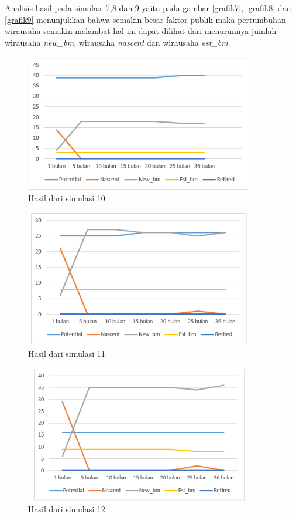 Analisis hasil pada simulasi 7,8 dan 9 yaitu pada gambar \ref{grafik7}, \ref{grafik8} dan \ref{grafik9} menunjukkan bahwa semakin besar faktor publik maka pertumbuhan wirausaha semakin melambat hal ini dapat dilihat dari menurunnya jumlah wirausaha \textit{new\_bm}, wirausaha \textit{nascent} dan wirausaha \textit{est\_bm}.

	\begin{figure} [H]
	\centering  
	\includegraphics[width=10cm, height=6cm]{grafik10} 
		\caption[Hasil dari simulasi 10]{Hasil dari simulasi 10}
	\label{grafik10} 
\end{figure}

	\begin{figure} [H]
	\centering  
	\includegraphics[width=10cm, height=6cm]{grafik11} 
		\caption[Hasil dari simulasi 11]{Hasil dari simulasi 11}
	\label{grafik11} 
\end{figure}

	\begin{figure} [H]
	\centering  
	\includegraphics[width=10cm, height=6cm]{grafik12} 
		\caption[Hasil dari simulasi 12]{Hasil dari simulasi 12}
	\label{grafik12} 
\end{figure}

